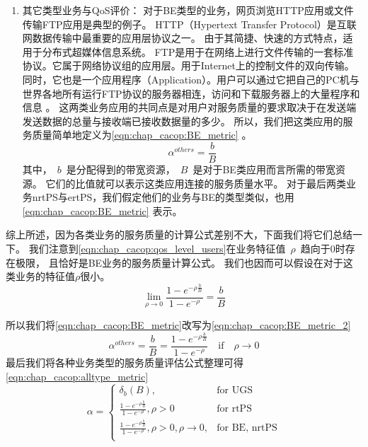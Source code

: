 \begin{enumerate}[(1)]
\item 其它类型业务与QoS评价：
对于BE类型的业务，网页浏览HTTP应用或文件传输FTP应用是典型的例子。
HTTP（Hypertext Transfer Protocol）是互联网数据传输中最重要的应用层协议之一\cite{Fielding_1999}。 
由于其简捷、快速的方式特点，适用于分布式超媒体信息系统。
FTP是用于在网络上进行文件传输的一套标准协议。它属于网络协议组的应用层。用于Internet上的控制文件的双向传输。
同时，它也是一个应用程序（Application）。用户可以通过它把自己的PC机与世界各地所有运行FTP协议的服务器相连，访问和下载服务器上的大量程序和信息 \cite{Postel_Reynolds_1985}。
这两类业务应用的共同点是对用户对服务质量的要求取决于在发送端发送数据的总量与接收端已接收数据量的多少。
所以，我们把这类应用的服务质量简单地定义为\eqref{eqn:chap_cacop:BE_metric} 。
%
\begin{equation}
\label{eqn:chap_cacop:BE_metric}
\alpha^{others} = \frac{b}{B}
\end{equation}
%
其中，~$b$~是分配得到的带宽资源，~$B$~是对于BE类应用而言所需的带宽资源。
它们的比值就可以表示这类应用连接的服务质量水平。
对于最后两类业务nrtPS与ertPS，我们假定他们的业务与BE的类型类似，也用 \eqref{eqn:chap_cacop:BE_metric} 表示。
\end{enumerate}

综上所述，因为各类业务的服务质量的计算公式差别不大，下面我们将它们总结一下。
我们注意到\eqref{eqn:chap_cacop:qos_level_users}在业务特征值~$\rho$~趋向于$0$时存在极限，
且恰好是BE业务的服务质量计算公式。 我们也因而可以假设在对于这类业务的特征值$\rho$很小。
%
\begin{equation}
\label{eqn:BE_limit}
\lim\limits_{\rho \to 0 } \frac{1- e^{-\rho \frac{b}{B} }}{1-e^{-\rho}} = \frac{b}{B}
\end{equation}

所以我们将\eqref{eqn:chap_cacop:BE_metric}改写为\eqref{eqn:chap_cacop:BE_metric_2}
%
\begin{equation}
\label{eqn:chap_cacop:BE_metric_2}
\alpha^{others} = \frac{b}{B} = \frac{1- e^{-\rho \frac{b}{B} }}{1-e^{-\rho}} \quad \text{if} \quad \rho \to 0
\end{equation}
%
最后我们将各种业务类型的服务质量评估公式整理可得\eqref{eqn:chap_cacop:alltype_metric}
%
\begin{equation}
\alpha = 
\begin{cases}
\delta_{b}(B), &\text{for UGS} \\
\frac{1- e^{-\rho \frac{b}{B} }}{1-e^{-\rho}}, \rho > 0& \text{for rtPS }\\
\frac{1- e^{-\rho \frac{b}{B} }}{1-e^{-\rho}}, \rho>0, \rho \to 0, &\text{for BE, nrtPS}\\
\end{cases}
\label{eqn:chap_cacop:alltype_metric}
\end{equation}

